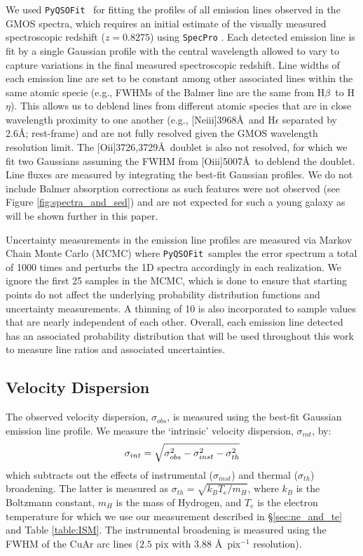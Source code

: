 \documentclass[twocolumn,tight,times,linenumbers]{aastex631}
\newcommand{\hbeta}{H$\beta$}
\newcommand{\oii}{[O{\sc ii}]}
\newcommand{\oiii}{[O{\sc iii}]}
\newcommand{\neiii}{[Ne{\sc iii}]}
\newcommand{\pyqsofit}{\texttt{PyQSOFit}}
\begin{document}
		We used \pyqsofit~\citep{Guo2018} for fitting the profiles of all emission lines observed in the GMOS spectra, which requires an initial estimate of the visually measured spectroscopic redshift ($z = 0.8275$) using \verb|SpecPro| \citep{Masters2011}. Each detected emission line is fit by a single Gaussian profile with the central wavelength allowed to vary to capture variations in the final measured spectroscopic redshift. Line widths of each emission line are set to be constant among other associated lines within the same atomic specie (e.g., FWHMs of the Balmer line are the same from \hbeta~to H$\eta$). This allows us to deblend lines from different atomic species that are in close wavelength proximity to one another (e.g., \neiii3968\AA~and H$\epsilon$ separated by 2.6\AA; rest-frame) and are not fully resolved given the GMOS wavelength resolution limit. The \oii3726,3729\AA~doublet is also not resolved, for which we fit two Gaussians assuming the FWHM from \oiii5007\AA~to deblend the doublet. Line fluxes are measured by integrating the best-fit Gaussian profiles. We do not include Balmer absorption corrections as such features were not observed (see Figure \ref{fig:spectra_and_sed}) and are not expected for such a young galaxy as will be shown further in this paper.
		
		Uncertainty measurements in the emission line profiles are measured via Markov Chain Monte Carlo (MCMC) where \pyqsofit~samples the error spectrum a total of 1000 times and perturbs the 1D spectra accordingly in each realization. We ignore the first 25 samples in the MCMC, which is done to ensure that starting points do not affect the underlying probability distribution functions and uncertainty measurements. A thinning of 10 is also incorporated to sample values that are nearly independent of each other. Overall, each emission line detected has an associated probability distribution that will be used throughout this work to measure line ratios and associated uncertainties. 
		
		\subsection{Velocity Dispersion}
		\label{sec:velocity_dispersion}
		
		The observed velocity dispersion, $\sigma_{obs}$, is measured using the best-fit Gaussian emission line profile. We measure the `intrinsic' velocity dispersion, $\sigma_{int}$, by:
		\begin{equation}
			\centering
			\sigma_{int} = \sqrt{ \sigma_{obs}^2 - \sigma_{inst}^2 - \sigma_{th}^2 }
		\end{equation}
		which subtracts out the effects of instrumental ($\sigma_{inst}$) and thermal ($\sigma_{th}$) broadening. The latter is measured as $\sigma_{th} = \sqrt{k_B T_e / m_H}$, where $k_B$ is the Boltzmann constant, $m_H$ is the mass of Hydrogen, and $T_e$ is the electron temperature for which we use our measurement described in \S\ref{sec:ne_and_te} and Table \ref{table:ISM}. The instrumental broadening is measured using the FWHM of the CuAr arc lines ($2.5$ pix with $3.88$ \AA~pix$^{-1}$ resolution). 
		
\end{document}
